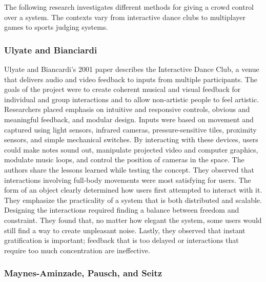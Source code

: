 The following research investigates different methods for giving a crowd control over a system. The contexts vary from interactive dance clubs to multiplayer games to sports judging systems.

\subsubsection{Ulyate and Bianciardi}

Ulyate and Biancardi's 2001 paper describes the Interactive Dance Club, a venue that delivers audio and video feedback to inputs from multiple participants. The goals of the project were to create coherent musical and visual feedback for individual and group interactions and to allow non-artistic people to feel artistic. Researchers placed emphasis on intuitive and responsive controls, obvious and meaningful feedback, and modular design. Inputs were based on movement and captured using light sensors, infrared cameras, pressure-sensitive tiles, proximity sensors, and simple mechanical switches. By interacting with these devices, users could make notes sound out, manipulate projected video and computer graphics, modulate music loops, and control the position of cameras in the space. The authors share the lessons learned while testing the concept. They observed that interactions involving full-body movements were most satisfying for users. The form of an object clearly determined how users first attempted to interact with it. They emphasize the practicality of a system that is both distributed and scalable. Designing the interactions required finding a balance between freedom and constraint. They found that, no matter how elegant the system, some users would still find a way to create unpleasant noise. Lastly, they observed that instant gratification is important; feedback that is too delayed or interactions that require too much concentration are ineffective.

\subsubsection{Maynes-Aminzade, Pausch, and Seitz}

